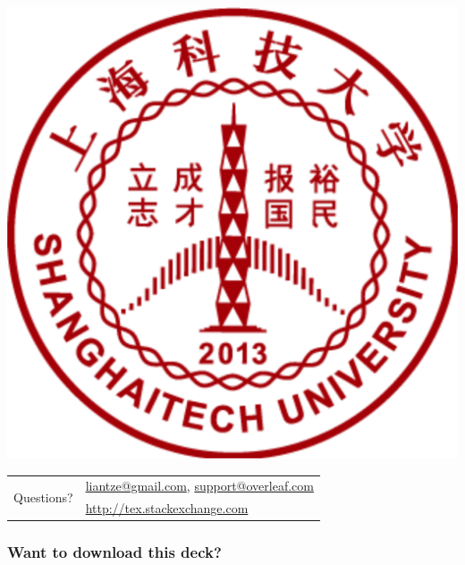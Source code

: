 \documentclass[xcolor={x11names,svgnames,dvipsnames},trans]{beamer}
\begin{document}
\begin{frame}
\centering
\includegraphics[width=.6\textwidth]{shTech}

\bigskip
\begin{tabular}{cl}
\multirow{2}{*}{\huge Questions?} & \url{liantze@gmail.com}, \url{support@overleaf.com}\\
& \url{http://tex.stackexchange.com}\\
\end{tabular}

\end{frame}

\begin{frame}
\frametitle{Want to download this deck?}
\centering
{}
\end{frame}
\end{document}
